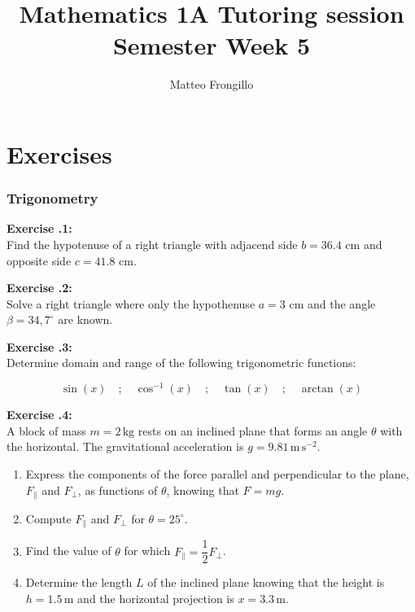 \documentclass{article}
\title{\textbf{Mathematics 1A Tutoring session\\ Semester Week 5}}
\author{Matteo Frongillo}
\date{}
\newcommand{\exercise}[2][]{%
  \par\noindent\textbf{Exercise \thesection.#1:\\} #2\par \vspace*{.25cm}
}
\begin{document}
\maketitle

\part*{Exercises}
\section{Trigonometry}
\exercise[1]{
  Find the hypotenuse of a right triangle with adjacend side $b = 36.4$ cm and opposite side $c = 41.8$ cm.
}

\exercise[2]{
  Solve a right triangle where only the hypothenuse $a=3$ cm and the angle $\beta = 34,7^\circ$ are known.
}

\exercise[3]{
  Determine domain and range of the following trigonometric functions:
  \begin{center}
    \[
      \sin\left(x\right)\quad ; \quad
      \cos^{-1}\left(x\right)\quad ; \quad
      \tan\left(x\right)\quad ; \quad
      \arctan\left(x\right)
    \]
  \end{center}
}

\exercise[4]{
  A block of mass $m = 2\,\mathrm{kg}$ rests on an inclined plane that forms an angle $\theta$ with the horizontal.
  The gravitational acceleration is $g = 9.81\,\mathrm{m\,s^{-2}}$.
  \begin{enumerate}[label=\alph*.]
    \item Express the components of the force parallel and perpendicular to the plane, $F_\parallel$ and $F_\perp$, as functions of $\theta$, knowing that $F = m g$.
    \item Compute $F_\parallel$ and $F_\perp$ for $\theta = 25^\circ$.
    \item Find the value of $\theta$ for which $F_\parallel = \dfrac{1}{2} F_\perp$.
    \item Determine the length $L$ of the inclined plane knowing that the height is $h = 1.5\,\mathrm{m}$ and the horizontal projection is $x = 3.3\,\mathrm{m}$.
  \end{enumerate}
}
\end{document}
